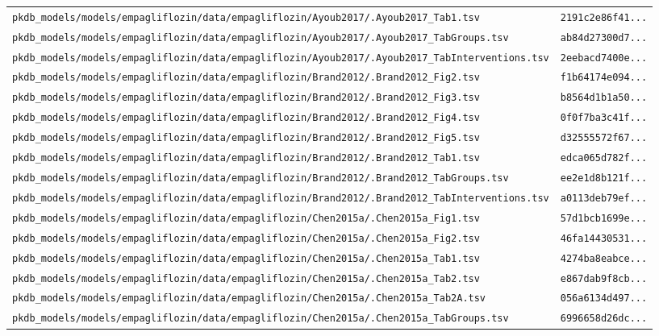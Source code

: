 \begin{longtable}{ll}
\texttt{pkdb\_models/models/empagliflozin/data/empagliflozin/Ayoub2017/.Ayoub2017\_Tab1.tsv} & \texttt{2191c2e86f41...} \\
\texttt{pkdb\_models/models/empagliflozin/data/empagliflozin/Ayoub2017/.Ayoub2017\_TabGroups.tsv} & \texttt{ab84d27300d7...} \\
\texttt{pkdb\_models/models/empagliflozin/data/empagliflozin/Ayoub2017/.Ayoub2017\_TabInterventions.tsv} & \texttt{2eebacd7400e...} \\
\texttt{pkdb\_models/models/empagliflozin/data/empagliflozin/Brand2012/.Brand2012\_Fig2.tsv} & \texttt{f1b64174e094...} \\
\texttt{pkdb\_models/models/empagliflozin/data/empagliflozin/Brand2012/.Brand2012\_Fig3.tsv} & \texttt{b8564d1b1a50...} \\
\texttt{pkdb\_models/models/empagliflozin/data/empagliflozin/Brand2012/.Brand2012\_Fig4.tsv} & \texttt{0f0f7ba3c41f...} \\
\texttt{pkdb\_models/models/empagliflozin/data/empagliflozin/Brand2012/.Brand2012\_Fig5.tsv} & \texttt{d32555572f67...} \\
\texttt{pkdb\_models/models/empagliflozin/data/empagliflozin/Brand2012/.Brand2012\_Tab1.tsv} & \texttt{edca065d782f...} \\
\texttt{pkdb\_models/models/empagliflozin/data/empagliflozin/Brand2012/.Brand2012\_TabGroups.tsv} & \texttt{ee2e1d8b121f...} \\
\texttt{pkdb\_models/models/empagliflozin/data/empagliflozin/Brand2012/.Brand2012\_TabInterventions.tsv} & \texttt{a0113deb79ef...} \\
\texttt{pkdb\_models/models/empagliflozin/data/empagliflozin/Chen2015a/.Chen2015a\_Fig1.tsv} & \texttt{57d1bcb1699e...} \\
\texttt{pkdb\_models/models/empagliflozin/data/empagliflozin/Chen2015a/.Chen2015a\_Fig2.tsv} & \texttt{46fa14430531...} \\
\texttt{pkdb\_models/models/empagliflozin/data/empagliflozin/Chen2015a/.Chen2015a\_Tab1.tsv} & \texttt{4274ba8eabce...} \\
\texttt{pkdb\_models/models/empagliflozin/data/empagliflozin/Chen2015a/.Chen2015a\_Tab2.tsv} & \texttt{e867dab9f8cb...} \\
\texttt{pkdb\_models/models/empagliflozin/data/empagliflozin/Chen2015a/.Chen2015a\_Tab2A.tsv} & \texttt{056a6134d497...} \\
\texttt{pkdb\_models/models/empagliflozin/data/empagliflozin/Chen2015a/.Chen2015a\_TabGroups.tsv} & \texttt{6996658d26dc...} \\

\end{longtable}
